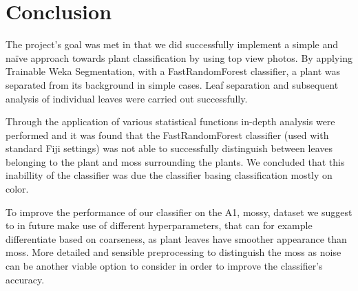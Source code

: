 \documentclass[paper=A4,bibliography=totocnumbered]{scrartcl}
\begin{document}
\section{Conclusion}
The project's goal was met in that we did successfully implement a simple and naïve approach towards plant classification by using top view photos. By applying Trainable Weka Segmentation, with a FastRandomForest classifier, a plant was separated from its background in simple cases. Leaf separation and subsequent analysis of individual leaves were carried out successfully. 

Through the application of various statistical functions in-depth analysis were performed and it was found that the FastRandomForest classifier (used with standard Fiji settings) was not able to successfully distinguish between leaves belonging to the plant and moss surrounding the plants. We concluded that this inabillity of the classifier was due the classifier basing classification mostly on color. 

To improve the performance of our classifier on the A1, mossy, dataset we suggest to in future make use of different hyperparameters, that can for example differentiate based on coarseness, as plant leaves have smoother appearance than moss. More detailed and sensible preprocessing to distinguish the moss as noise can be another viable option to consider in order to improve the classifier's accuracy.


\renewcommand\bibname{References} %

\end{document}
